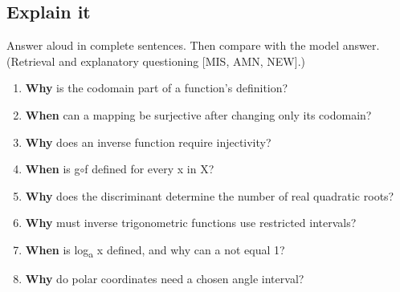 \documentclass[11pt]{article}
\begin{document}
\begin{keepsection}
\section{Explain it}

Answer aloud in complete sentences. Then compare with the model answer. (Retrieval and explanatory questioning [MIS, AMN, NEW].)

\begin{enumerate}
\item \textbf{Why} is the codomain part of a function’s definition?
\item \textbf{When} can a mapping be surjective after changing only its codomain?
\item \textbf{Why} does an inverse function require injectivity?
\item \textbf{When} is g\ensuremath{\circ}f defined for every x in X?
\item \textbf{Why} does the discriminant determine the number of real quadratic roots?
\item \textbf{Why} must inverse trigonometric functions use restricted intervals?
\item \textbf{When} is log\textsubscript{a} x defined, and why can a not equal 1?
\item \textbf{Why} do polar coordinates need a chosen angle interval?
\end{enumerate}

\end{keepsection}

\clearpage
\end{document}
